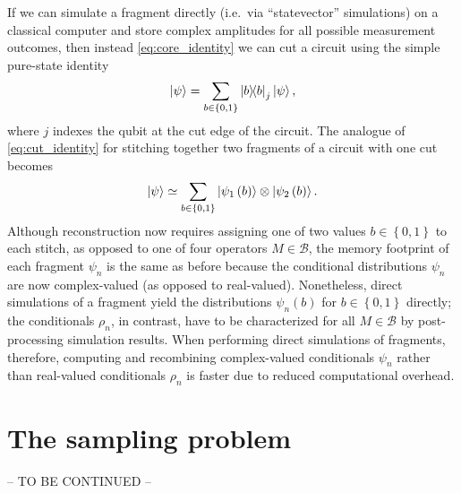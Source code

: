 \documentclass[nofootinbib,notitlepage,11pt]{revtex4-2}
\newcommand{\p}[1]{\left(#1\right)} %
\renewcommand{\set}[1]{\left\{#1\right\}} %
\newcommand{\B}{\mathcal{B}}
\begin{document}
If we can simulate a fragment directly (i.e.~via ``statevector''
simulations) on a classical computer and store complex amplitudes for
all possible measurement outcomes, then instead
\eqref{eq:core_identity} we can cut a circuit using the simple
pure-state identity
\begin{align}
  \ket\psi = \sum_{b\in\set{0,1}} \op{b}_j \ket\psi,
\end{align}
where $j$ indexes the qubit at the cut edge of the circuit.  The
analogue of \eqref{eq:cut_identity} for stitching together two
fragments of a circuit with one cut becomes
\begin{align}
  \ket\psi \simeq
  \sum_{b\in\set{0,1}} \ket{\psi_1\p{b}} \otimes \ket{\psi_2\p{b}}.
\end{align}
Although reconstruction now requires assigning one of two values
$b\in\set{0,1}$ to each stitch, as opposed to one of four operators
$M\in\B$, the memory footprint of each fragment $\psi_n$ is the same
as before because the conditional distributions $\psi_n$ are now
complex-valued (as opposed to real-valued).  Nonetheless, direct
simulations of a fragment yield the distributions $\psi_n\p{b}$ for
$b\in\set{0,1}$ directly; the conditionals $\rho_n$, in contrast, have
to be characterized for all $M\in\B$ by post-processing simulation
results.  When performing direct simulations of fragments, therefore,
computing and recombining complex-valued conditionals $\psi_n$ rather
than real-valued conditionals $\rho_n$ is faster due to reduced
computational overhead.


\section{The sampling problem}
\label{sec:sampling}

-- TO BE CONTINUED --



\end{document}
